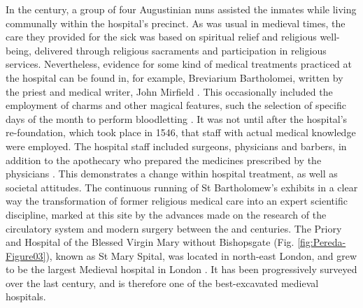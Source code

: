 \documentclass[%
	]{ijsra}
\begin{document}
In the  century\AD, a group of four Augustinian nuns assisted the inmates while living communally within the hospital’s precinct. As was usual in medieval times, the care they provided for the sick was based on spiritual relief and religious well-being, delivered through religious sacraments and participation in religious services. 
Nevertheless, evidence for some kind of medical treatments practiced at the hospital can be found in, for example, Breviarium Bartholomei, written by the priest and medical writer, John Mirfield \parencite[36-37]{Dainton_1961}. 
This occasionally included the employment of charms and other magical features, such the selection of specific days of the month to perform bloodletting \parencite[35-36]{Rider_2012}. 
It was not until after the hospital’s re-foundation, which took place in 1546, that staff with actual medical knowledge were employed. The hospital staff included surgeons, physicians and barbers, in addition to the apothecary who prepared the medicines prescribed by the physicians \parencite[38-39]{Dainton_1961}. This demonstrates a change within hospital treatment, as well as societal attitudes.  
The continuous running of St Bartholomew’s exhibits in a clear way the transformation of former religious medical care into an expert scientific discipline, marked at this site by the advances made on the research of the circulatory system and modern surgery between the  and  centuries.
\IJSRAseparator
{}
The Priory and Hospital of the Blessed Virgin Mary without Bishopsgate (Fig. \ref{fig:Pereda-Figure03}), %
known as St Mary Spital, was located in north-east London, and grew to be the largest Medieval hospital in London \parencite[60]{Bowers_2007}. It has been progressively surveyed over the last century, and is therefore one of the best-excavated medieval hospitals. 
\end{document}

